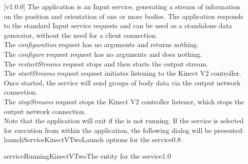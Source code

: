 [v1.0.0]
The  application is an Input service,
generating a stream of information on the position and orientation of one or more bodies.
The application responds to the standard Input service requests and can be used as a
standalone data generator, without the need for a client connection.\\

The \emph{configuration} request has no arguments and returns nothing.\\

The \emph{configure} request request has no arguments and does nothing.\\

The \emph{restartStreams} request stops and then starts the output stream.\\

The \emph{startStreams} request request initiates listening to the Kinect V2 controller.
Once started, the service will send groups of body data via the output \yarp{} network
connection.\\

The \emph{stopStreams} request stops the Kinect V2 controller listener, which stops the
output \yarp{} network connection.\\ 

Note that the application will exit if the \emph{\RS} is not running.
\insertAppParameters
\insertTagDescription{\KVtwoI}
\insertInputServiceComment
\condPage
\insertStandardServiceCommands
\secondaryEnd
\condPage
{}
If the service is selected for execution from within the \emph{\MMMU} application, the
following dialog will be presented:
%
{launchServiceKinectVTwo}{Launch options for the \emph{\KVtwoI} service}{0.8}

%
{serviceRunningKinectVTwo}{The \emph{\MMMU} entity for the \emph{\KVtwoI} service}{1.0}
\secondaryEnd
\primaryEnd{}
